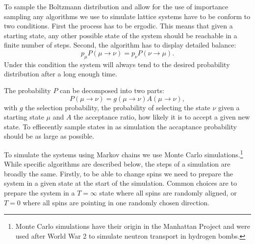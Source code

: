 \documentclass[11pt, a4paper]{report} %
\begin{document}
To sample the Boltzmann distribution and allow for the use of importance sampling any algorithms we use to simulate lattice systems have to be conform to two conditions.
First the process has to be ergodic.
This means that given a starting state, any other possible state of the system should be reachable in a finite number of steps.
Second, the algorithm has to display detailed balance:
\begin{equation}
	p_{\mu} P(\mu \to \nu) = p_{\nu} P(\nu \to \mu).
\end{equation}
Under this condition the system will always tend to the desired probability distribution after a long enough time.

The probability \(P\) can be decomposed into two parts:
\begin{equation}
	P(\mu\to\nu) = g(\mu\to\nu) A(\mu\to \nu),
\end{equation}
with \(g\) the selection probability, the probability of selecting the state \(\nu\) given a starting state \(\mu\) and \(A\) the acceptance ratio, how likely it is to accept a given new state.
To effiecently sample states in as simulation the accaptance probability should be as large as possible.

To simulate the systems using Markov chains we use Monte Carlo simulations.\footnote{Monte Carlo simulations have their origin in the Manhattan Project and were used after World War 2 to simulate neutron transport in hydrogen bombs.\cite{newman:1999}}
While specific algorithms are described below, the steps of a simulation are broadly the same.
Firstly, to be able to change spins we need to prepare the system in a given state at the start of the simulation.
Common choices are to prepare the system in a \(T=\infty\) state where all spins are randomly aligned, or \(T=0\) where all spins are pointing in one randomly chosen direction.\cite{newman:1999}
\end{document}
